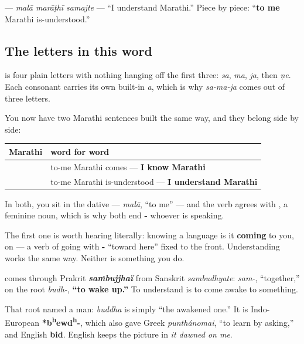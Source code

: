 \textbf{  } — \emph{malā marāṭhī samajte} — \textquotedblleft{}I understand Marathi.\textquotedblright{} Piece by piece: \textquotedblleft{}\textbf{to me} Marathi is-understood.\textquotedblright{}

\subsection*{The letters in this word}
\textbf{} is four plain letters with nothing hanging off the first three: \textbf{} \emph{sa}, \textbf{} \emph{ma}, \textbf{} \emph{ja}, then \textbf{} \emph{ṇe}. Each consonant carries its own built-in \emph{a}, which is why \emph{sa-ma-ja} comes out of three letters.

\begin{grammarlens}[title={Grammar Lens: three verbs, one frame}]
You now have two Marathi sentences built the same way, and they belong side by side:

\noindent
\begin{tabularx}{\linewidth}{@{}>{\raggedright\arraybackslash}X>{\raggedright\arraybackslash}X@{}}
\toprule
\textbf{Marathi} & \textbf{word for word} \\
\midrule
\mr{मला} \mr{मराठी} \mr{येते} & to-me Marathi comes — \textbf{I know Marathi} \\
\mr{मला} \mr{मराठी} \mr{समजते} & to-me Marathi is-understood — \textbf{I understand Marathi} \\
\bottomrule
\end{tabularx}

In both, you sit in the dative — \emph{malā}, \textquotedblleft{}to me\textquotedblright{} — and the verb agrees with \textbf{}, a feminine noun, which is why both end \textbf{-} whoever is speaking.

The first one is worth hearing literally: knowing a language is it \textbf{coming} to you, on \textbf{} — a verb of going with \textbf{-} \textquotedblleft{}toward here\textquotedblright{} fixed to the front. Understanding works the same way. Neither is something you do.
\end{grammarlens}

\begin{cousinweb}
\textbf{} comes through Prakrit \emph{\textbf{saṁbujjhaï}} from Sanskrit \textbf{} \emph{sambudhyate}: \textbf{} \emph{sam-}, \textquotedblleft{}together,\textquotedblright{} on the root \textbf{} \emph{budh-}, \textbf{\textquotedblleft{}to wake up.\textquotedblright{}} To understand is to come awake to something.

That root named a man: \textbf{} \emph{buddha} is simply \textquotedblleft{}the awakened one.\textquotedblright{} It is Indo-European \textbf{*b\textsuperscript{h}ewd\textsuperscript{h}-}, which also gave Greek \emph{punthánomai}, \textquotedblleft{}to learn by asking,\textquotedblright{} and English \textbf{bid}. English keeps the picture in \emph{it dawned on me}.
\end{cousinweb}

